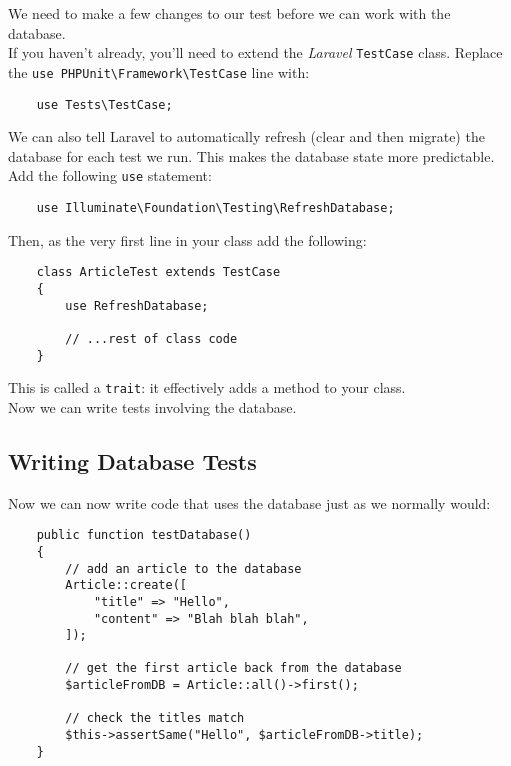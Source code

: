 We need to make a few changes to our test before we can work with the database.
\\

If you haven't already, you'll need to extend the \textit{Laravel} \texttt{TestCase} class. Replace the \texttt{use PHPUnit\textbackslash{}Framework\textbackslash{}TestCase} line with:

\begin{verbatim}
    use Tests\TestCase;
\end{verbatim}

We can also tell Laravel to automatically refresh (clear and then migrate) the database for each test we run. This makes the database state more predictable.
\\

Add the following \texttt{use} statement:

\begin{verbatim}
    use Illuminate\Foundation\Testing\RefreshDatabase;
\end{verbatim}

Then, as the very first line in your class add the following:

\begin{verbatim}
    class ArticleTest extends TestCase
    {
        use RefreshDatabase;

        // ...rest of class code
    }
\end{verbatim}

This is called a \texttt{trait}: it effectively adds a method to your class.
\\

Now we can write tests involving the database.


\subsection{Writing Database Tests}

Now we can now write code that uses the database just as we normally would:

\begin{verbatim}
    public function testDatabase()
    {
        // add an article to the database
        Article::create([
            "title" => "Hello",
            "content" => "Blah blah blah",
        ]);

        // get the first article back from the database
        $articleFromDB = Article::all()->first();

        // check the titles match
        $this->assertSame("Hello", $articleFromDB->title);
    }
\end{verbatim}


